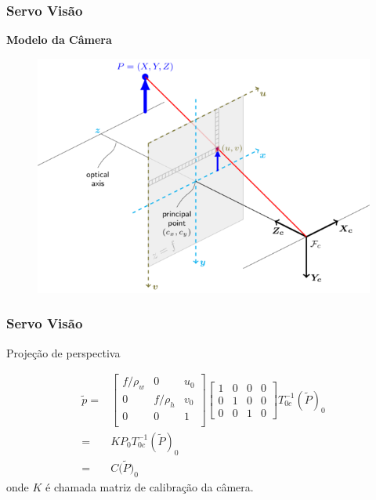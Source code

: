 \documentclass{beamer}
\newcommand\m[1]{\begin{bmatrix}#1\end{bmatrix}}
\begin{document}
\begin{frame}
\frametitle{Servo Visão}
\textbf{Modelo da Câmera}
\begin{figure}
\includegraphics[height=0.75\paperheight]{./img/camera_model2.png}
\end{figure}
\end{frame}

\begin{frame}
\frametitle{Servo Visão}

\begin{block}{Projeção de perspectiva} %

\begin{align}\label{eq:camera_projection}
{\tilde{p}} =& 
\m {
	f/\rho_w & 0 & u_0 \\
	0        & f/\rho_h &v_0 \\
	0 & 0 & 1 \\
}
\m{  1 & 0 & 0 & 0\\
	 0 & 1 & 0 & 0\\
	 0 & 0 & 1 & 0	
}
{T}_{0c}^{-1} (\tilde{{P}})_0\\
=& {K} {P}_0 {T}_{0c}^{-1} (\tilde{{P}})_0 \\ 
=& {C} ({\tilde{P})_0}
\end{align}
onde $K$ é chamada matriz de calibração da câmera.
\end{block}
\end{frame}
\end{document}
